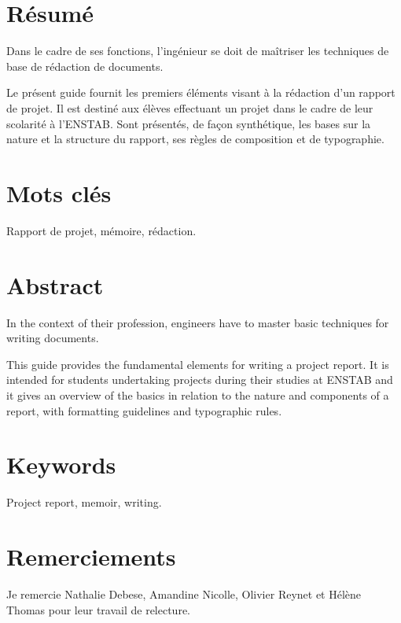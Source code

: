 \section*{Résumé}
  Dans le cadre de ses fonctions, l'ingénieur se doit de maîtriser les
  techniques de base de rédaction de documents.

  Le présent guide fournit les premiers éléments visant à la rédaction d'un
  rapport de projet. Il est destiné aux élèves effectuant un projet dans le
  cadre de leur scolarité à l'\gls{ENSTAB}.  Sont présentés, de façon
  synthétique, les bases sur la nature et la structure du rapport, ses règles
  de composition et de typographie.

\section*{Mots clés}
Rapport de projet, mémoire, rédaction.

\section*{Abstract}
  In the context of their profession, engineers have to master basic
  techniques for writing documents.
  
  This guide provides the fundamental elements for writing a project
  report. It is intended for students undertaking projects during their
  studies at \gls{ENSTAB} and it gives an overview of the basics in
  relation to the nature and components of a report, with formatting
  guidelines and typographic rules.
  
\section*{Keywords}
Project report, memoir, writing.


\section*{Remerciements}

Je remercie Nathalie Debese, Amandine Nicolle, Olivier Reynet et Hélène Thomas
pour leur travail de relecture.